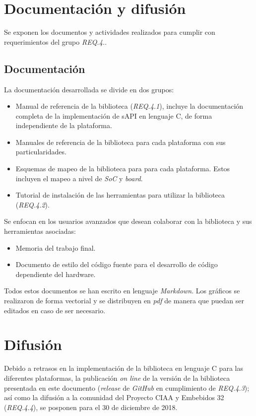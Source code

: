 \newpage 
\section{Documentación y difusión}
\label{sec:documentation}

Se exponen los documentos y actividades realizados para cumplir con requerimientos del grupo \emph{REQ.4.}.

\subsection{Documentación}

La documentación desarrollada se divide en dos grupos:


\begin{itemize}
\item
Manual de referencia de la biblioteca (\emph{REQ.4.1}), incluye la documentación completa de la implementación de sAPI en lenguaje C, de forma independiente de la plataforma.
\item
Manuales de referencia de la biblioteca para cada plataforma con sus particularidades.
\item
Esquemas de mapeo de la biblioteca para para cada plataforma. Estos incluyen el mapeo a nivel de \emph{SoC} y \emph{board}.
\item
Tutorial de instalación de las herramientas para utilizar la biblioteca (\emph{REQ.4.2}).
\end{itemize}


Se enfocan en los usuarios avanzados que desean colaborar con la biblioteca y sus herramientas asociadas:

\begin{itemize}
\item
Memoria del trabajo final.
\item
Documento de estilo del código fuente para el desarrollo de código dependiente del hardware.
\end{itemize}

Todos estos documentos se han escrito en lenguaje \emph{Markdown}. Los gráficos se realizaron de forma vectorial y se distribuyen en \emph{pdf} de manera que puedan ser editados en caso de ser necesario. 

\section{Difusión}

Debido a retrasos en la implementación de la biblioteca en lenguaje C para las diferentes plataformas, la publicación \emph{on line} de la versión de la biblioteca presentada en este documento (\emph{release} de \emph{GitHub} en cumplimiento de \emph{REQ.4.3}); así como la difusión a la comunidad del Proyecto CIAA y Embebidos 32 (\emph{REQ.4.4}), se posponen para el 30 de diciembre de 2018.
